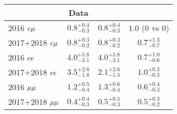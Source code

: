 \begin{table}
\begin{tabular}{l|ccc}
  & Data\\
\hline
2016 $e{\mu}$       & $0.8^{+0.4}_{-0.3}$ & $0.8^{+0.4}_{-0.3}$ & $1.0$ (0 vs 0)      \\
2017+2018 $e{\mu}$  & $0.8^{+0.3}_{-0.2}$ & $0.8^{+0.3}_{-0.2}$ & $0.7^{+1.3}_{-0.7}$ \\
2016 $ee$        & $4.0^{+5.8}_{-3.1}$ & $4.0^{+5.8}_{-3.1}$ & $0.7^{+1.0}_{-0.6}$ \\
2017+2018 $ee$   & $3.5^{+2.6}_{-1.8}$ & $2.1^{+2.6}_{-1.5}$ & $1.0^{+0.3}_{-0.3}$ \\
2016 ${\mu}{\mu}$      & $1.2^{+0.5}_{-0.4}$ & $1.3^{+0.6}_{-0.4}$ & $0.6^{+0.4}_{-0.3}$ \\
2017+2018 ${\mu}{\mu}$ & $0.4^{+0.4}_{-0.3}$ & $0.5^{+0.5}_{-0.3}$ & $0.5^{+0.3}_{-0.2}$ \\
\hline
\end{tabular}
\end{table}
